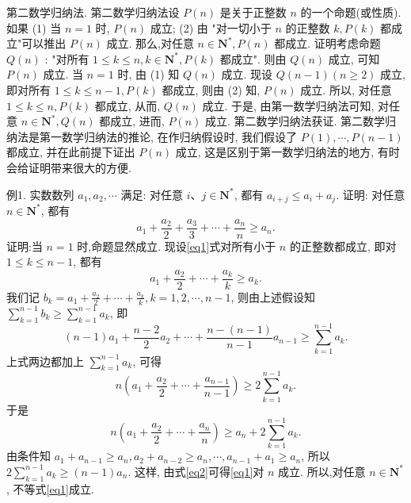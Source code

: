 
第二数学归纳法.
第二数学归纳法设 $P(n)$ 是关于正整数 $n$ 的一个命题(或性质). 如果
(1) 当 $n=1$ 时, $P(n)$ 成立;
(2) 由 "对一切小于 $n$ 的正整数 $k, P(k)$ 都成立"可以推出 $P(n)$ 成立.
那么,对任意 $n \in \mathbf{N}^*, P(n)$ 都成立.
证明考虑命题 $Q(n)$ : "对所有 $1 \leqslant k \leqslant n, k \in \mathbf{N}^*, P(k)$ 都成立". 则由 $Q(n)$ 成立, 可知 $P(n)$ 成立.
当 $n=1$ 时, 由 (1) 知 $Q(n)$ 成立.
现设 $Q(n-1)(n \geqslant 2)$ 成立, 即对所有 $1 \leqslant k \leqslant n-1, P(k)$ 都成立, 则由 (2) 知, $P(n)$ 成立.
所以, 对任意 $1 \leqslant k \leqslant n, P(k)$ 都成立, 从而, $Q(n)$ 成立.
于是, 由第一数学归纳法可知, 对任意 $n \in \mathbf{N}^*, Q(n)$ 都成立, 进而, $P(n)$ 成立.
第二数学归纳法获证.
第二数学归纳法是第一数学归纳法的推论, 在作归纳假设时, 我们假设了 $P(1), \cdots, P(n-1)$ 都成立, 并在此前提下证出 $P(n)$ 成立, 这是区别于第一数学归纳法的地方, 有时会给证明带来很大的方便.



例1. 实数数列 $a_1, a_2, \cdots$ 满足: 对任意 $i 、 j \in \mathbf{N}^*$, 都有 $a_{i+j} \leqslant a_i+a_j$. 证明: 对任意 $n \in \mathbf{N}^*$, 都有
$$
a_1+\frac{a_2}{2}+\frac{a_3}{3}+\cdots+\frac{a_n}{n} \geqslant a_n . \label{eq1}
$$
证明:当 $n=1$ 时,命题显然成立.
现设\ref{eq1}式对所有小于 $n$ 的正整数都成立, 即对 $1 \leqslant k \leqslant n-1$, 都有
$$
a_1+\frac{a_2}{2}+\cdots+\frac{a_k}{k} \geqslant a_k .
$$
我们记 $b_k=a_1+\frac{a_2}{2}+\cdots+\frac{a_k}{k}, k=1,2, \cdots, n-1$, 则由上述假设知 $\sum_{k=1}^{n-1} b_k \geqslant \sum_{k=1}^{n-1} a_k$, 即
$$
(n-1) a_1+\frac{n-2}{2} a_2+\cdots+\frac{n-(n-1)}{n-1} a_{n-1} \geqslant \sum_{k=1}^{n-1} a_k .
$$
上式两边都加上 $\sum_{k=1}^{n-1} a_k$, 可得
$$
n\left(a_1+\frac{a_2}{2}+\cdots+\frac{a_{n-1}}{n-1}\right) \geqslant 2 \sum_{k=1}^{n-1} a_k .
$$
于是
$$
n\left(a_1+\frac{a_2}{2}+\cdots+\frac{a_n}{n}\right) \geqslant a_n+2 \sum_{k=1}^{n-1} a_k . \label{eq2}
$$
由条件知 $a_1+a_{n-1} \geqslant a_n, a_2+a_{n-2} \geqslant a_n, \cdots, a_{n-1}+a_1 \geqslant a_n$, 所以 $2 \sum_{k=1}^{n-1} a_k \geqslant (n-1) a_n$. 这样, 由式\ref{eq2}可得\ref{eq1}对 $n$ 成立.
所以,对任意 $n \in \mathbf{N}^*$, 不等式\ref{eq1}成立.



